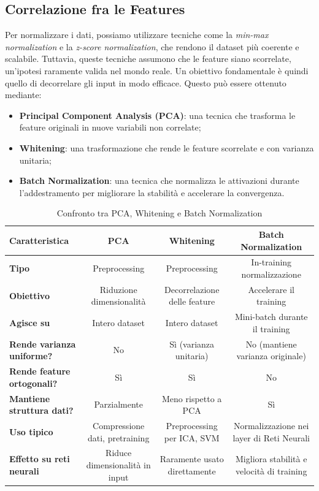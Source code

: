\subsection{Correlazione fra le Features}
Per normalizzare i dati, possiamo utilizzare tecniche come la \textit{min-max normalization} e la \textit{z-score normalization}, che rendono il dataset più coerente e scalabile. Tuttavia, queste tecniche assumono che le feature siano scorrelate, un'ipotesi raramente valida nel mondo reale. Un obiettivo fondamentale è quindi quello di decorrelare gli input in modo efficace. Questo può essere ottenuto mediante:
\begin{itemize}
\item\textbf{Principal Component Analysis (PCA)}: una tecnica che trasforma le feature originali in nuove variabili non correlate;
\item\textbf{Whitening}: una trasformazione che rende le feature scorrelate e con varianza unitaria;
\item\textbf{Batch Normalization}: una tecnica che normalizza le attivazioni durante l'addestramento per migliorare la stabilità e accelerare la convergenza.
\end{itemize}

\begin{table}[!ht]
    \centering
    \caption{Confronto tra PCA, Whitening e Batch Normalization}
    \begin{adjustbox}{width=\textwidth}
    \begin{tabular}{@{} lccc @{}}
        \toprule
        \textbf{Caratteristica} & \textbf{PCA} & \textbf{Whitening} & \textbf{Batch Normalization} \\
        \midrule
        \textbf{Tipo} & Preprocessing & Preprocessing & In-training normalizzazione \\
        \textbf{Obiettivo} & Riduzione dimensionalità & Decorrelazione delle feature & Accelerare il training \\
        \textbf{Agisce su} & Intero dataset & Intero dataset & Mini-batch durante il training \\
        \textbf{Rende varianza uniforme?} & No & Sì (varianza unitaria) & No (mantiene varianza originale) \\
        \textbf{Rende feature ortogonali?} & Sì & Sì & No \\
        \textbf{Mantiene struttura dati?} & Parzialmente & Meno rispetto a PCA & Sì \\
        \textbf{Uso tipico} & Compressione dati, pretraining & Preprocessing per ICA, SVM & Normalizzazione nei layer di Reti Neurali \\
        \textbf{Effetto su reti neurali} & Riduce dimensionalità in input & Raramente usato direttamente & Migliora stabilità e velocità di training \\
        \bottomrule
    \end{tabular}
    \end{adjustbox}
\end{table}

